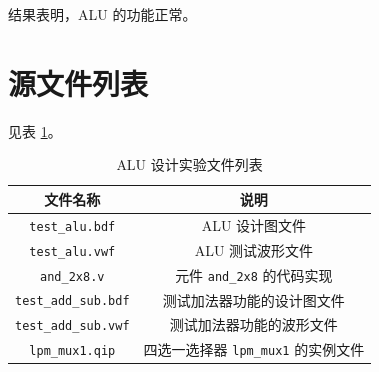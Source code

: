 结果表明，ALU 的功能正常。

\section{源文件列表}

见表 \ref{table:2-files}。

\begin{table}[h]
    \centering
    \caption{ALU 设计实验文件列表}
    \label{table:2-files}
    \begin{tabular}{|c|c|}
        \hline
        文件名称 & 说明 \\ \hline
        \verb|test_alu.bdf| & ALU 设计图文件 \\ \hline
        \verb|test_alu.vwf| & ALU 测试波形文件 \\ \hline
        \verb|and_2x8.v| & 元件 \verb|and_2x8| 的代码实现 \\ \hline
        \verb|test_add_sub.bdf| & 测试加法器功能的设计图文件 \\ \hline
        \verb|test_add_sub.vwf| & 测试加法器功能的波形文件 \\ \hline
        \verb|lpm_mux1.qip| & 四选一选择器 \verb|lpm_mux1| 的实例文件 \\ \hline
    \end{tabular}
\end{table}